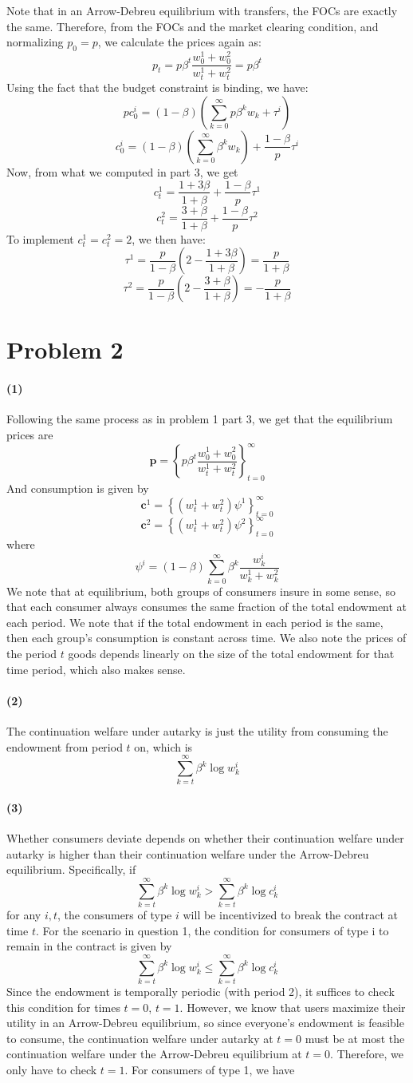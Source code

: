 \documentclass[10pt,letter]{article}
\renewcommand{\vector}[1]{\boldsymbol{#1}}
\newcommand{\problem}[1]{\section*{Problem #1}}
\newcommand{\problempart}[1]{\paragraph{#1}}
\begin{document}
Note that in an Arrow-Debreu equilibrium with transfers, the FOCs are exactly the same. Therefore, from the FOCs and the market clearing condition, and normalizing $p_0 = p$, we calculate the prices again as:
\[ p_t = p\beta^t \frac{w^1_0 + w^2_0}{w^1_t + w^2_t} = p\beta^t \]
Using the fact that the budget constraint is binding, we have:
\[ p c^i_0 = (1-\beta)\left(\sum_{k=0}^\infty p \beta^k w_k + \tau^i \right) \]
\[ c^i_0 = (1-\beta)\left(\sum_{k=0}^\infty \beta^k w_k \right) +\frac{1-\beta}{p} \tau^i  \]
Now, from what we computed in part 3, we get
\[ c^1_t = \frac{1 + 3\beta}{1 + \beta} +\frac{1-\beta}{p} \tau^1 \]
\[ c^2_t = \frac{3 + \beta}{1 + \beta} +\frac{1-\beta}{p} \tau^2 \]
To implement $c^1_t =  c^2_t = 2$, we then have:
\[ \tau^1 = \frac{p}{1-\beta}\left(2 - \frac{1+3\beta}{1+\beta} \right) = \frac{p}{1+\beta} \]
\[ \tau^2 = \frac{p}{1-\beta}\left(2 - \frac{3+\beta}{1+\beta} \right) = -\frac{p}{1+\beta} \]
\problem{2}
\problempart{(1)}
Following the same process as in problem 1 part 3, we get that the equilibrium prices are
\[ \vector{p} = \left\{ p\beta^t \frac{w^1_0 + w^2_0}{w^1_t + w^2_t} \right\}_{t=0}^\infty \]
And consumption is given by
\[ \vector{c}^1 = \left\{ (w^1_t + w^2_t)\psi^1 \right\}_{t=0}^\infty \]
\[ \vector{c}^2 = \left\{ (w^1_t + w^2_t)\psi^2 \right\}_{t=0}^\infty \]
where
\[ \psi^i = (1-\beta)\sum_{k=0}^\infty \beta^k \frac{w^i_k}{w^1_k + w^2_k} \]
We note that at equilibrium, both groups of consumers insure in some sense, so that each consumer always consumes the same fraction of the total endowment at each period. We note that if the total endowment in each period is the same, then each group's consumption is constant across time. We also note the prices of the period $t$ goods depends linearly on the size of the total endowment for that time period, which also makes sense.
\problempart{(2)}
The continuation welfare under autarky is just the utility from consuming the endowment from period $t$ on, which is
\[ \sum_{k=t}^\infty \beta^k \log w^i_k \]
\problempart{(3)}
Whether consumers deviate depends on whether their continuation welfare under autarky is higher than their continuation welfare under the Arrow-Debreu equilibrium. Specifically, if
\[ \sum_{k=t}^\infty \beta^k \log w^i_k > \sum_{k=t}^\infty \beta^k \log c^i_k \]
for any $i, t$, the consumers of type $i$ will be incentivized to break the contract at time $t$. For the scenario in question 1, the condition for consumers of type i to remain in the contract is given by
\[ \sum_{k=t}^\infty \beta^k \log w^i_k \le \sum_{k=t}^\infty \beta^k \log c^i_k \]
Since the endowment is temporally periodic (with period 2), it suffices to check this condition for times $t=0$, $t=1$. However, we know that users maximize their utility in an Arrow-Debreu equilibrium, so since everyone's endowment is feasible to consume, the continuation welfare under autarky at $t=0$ must be at most the continuation welfare under the Arrow-Debreu equilibrium at $t=0$. Therefore, we only have to check $t=1$. For consumers of type 1, we have
\end{document}
